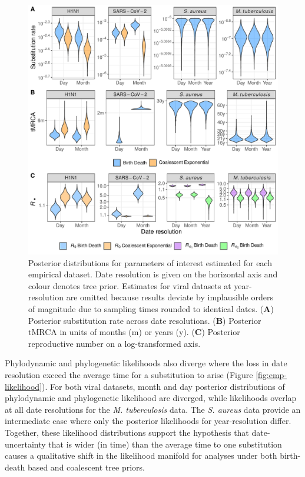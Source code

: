 \documentclass[12pt]{article}
\begin{document}
\begin{spacing}{2}
\begin{figure}[H]
    \centering
    \includegraphics[width=\textwidth]{empirical_parms.pdf}
    \caption{Posterior distributions for parameters of interest estimated for each empirical dataset. Date resolution is given on the horizontal axis and colour denotes tree prior. Estimates for viral datasets at year-resolution are omitted because results deviate by implausible orders of magnitude due to sampling times rounded to identical dates. (\textbf{A}) Posterior substitution rate across date resolutions. (\textbf{B}) Posterior tMRCA in units of months (m) or years (y).  (\textbf{C}) Posterior reproductive number on a log-transformed axis.}
    \label{fig:emp-parm}
\end{figure}

Phylodynamic and phylogenetic likelihoods also diverge where the loss in date resolution exceed the average time for a substitution to arise (Figure \ref{fig:emp-likelihood}). For both viral datasets, month and day posterior distributions of phylodynamic and phylogenetic likelihood are diverged, while likelihoods overlap at all date resolutions for the \textit{M. tuberculosis} data. The \textit{S. aureus} data provide an intermediate case where only the posterior likelihoods for year-resolution differ. Together, these likelihood distributions support the hypothesis that date-uncertainty that is wider (in time) than the average time to one substitution causes a qualitative shift in the likelihood manifold for analyses under both birth-death based and coalescent tree priors.


\end{spacing}
\end{document}
